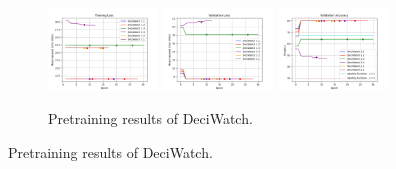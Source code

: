 \documentclass{beamer}
\begin{document}
\begin{frame}
\begin{figure}[htbp]
        \begin{subfigure}[b]{\textwidth}
            \centering
            \includegraphics[width=0.32\textwidth]{../report/entities/pretrained/deciwatch/train_losses.png}
            \includegraphics[width=0.32\textwidth]{../report/entities/pretrained/deciwatch/val_losses.png}
            \includegraphics[width=0.32\textwidth]{../report/entities/pretrained/deciwatch/val_accs.png}
            \caption{Pretraining results of DeciWatch.}
        \end{subfigure}
       \hfill
    \end{figure}
\end{frame}
\end{document}
